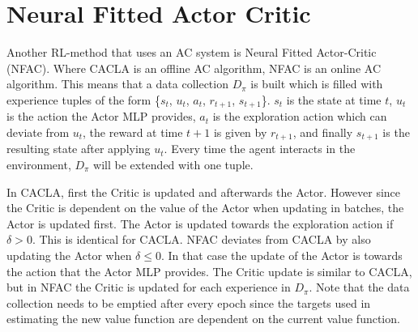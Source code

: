 
\section{Neural Fitted Actor Critic}
Another RL-method that uses an AC system is Neural Fitted Actor-Critic (NFAC). Where CACLA is an offline AC algorithm, NFAC is an online AC algorithm. This means that a data collection $D_{\pi}$ is built which is filled with experience tuples of the form \{$s_{t}$, $u_{t}$, $a_{t}$, $r_{t+1}$, $s_{t+1}$\}. $s_{t}$ is the state at time $t$, $u_{t}$ is the action the Actor MLP provides, $a_{t}$ is the exploration action which can deviate from $u_{t}$, the reward at time $t+1$ is given by $r_{t+1}$, and finally $s_{t+1}$ is the resulting state after applying $u_{t}$. Every time the agent interacts in the environment, $D_{\pi}$ will be extended with one tuple.

In CACLA, first the Critic is updated and afterwards the Actor. However since the Critic is dependent on the value of the Actor when updating in batches, the Actor is updated first. The Actor is updated towards the exploration action if $\delta > 0$. This is identical for CACLA. NFAC deviates from CACLA by also updating the Actor when $\delta \leq 0$. In that case the update of the Actor is towards the action that the Actor MLP provides. The Critic update is similar to CACLA, but in NFAC the Critic is updated for each experience in $D_{\pi}$. Note that the data collection needs to be emptied after every epoch since the targets used in estimating the new value function are dependent on the current value function. 

